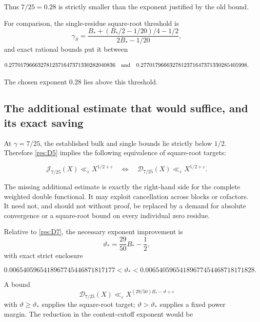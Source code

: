 \documentclass[11pt]{article}
\newcommand{\mathscr}{\mathcal}
\numberwithin{equation}{section}
\begin{document}
Thus \(7/25=0.28\) is strictly smaller than the exponent justified by
the old bound.

For comparison, the single-residue square-root threshold is \[
 \gamma_S=
 \frac{B_*+(B_*/2-1/20)/4-1/2}{2B_*-1/20},
\] and exact rational bounds put it between

\begin{equation}\label{res:D9}
0.2770179666327812371647371330282040836
 \quad\hbox{and}\quad
 0.2770179666327812371647371330285405998.
\end{equation}

The chosen exponent \(0.28\) lies above this threshold.

\subsection{The additional estimate that would suffice, and its exact
saving}\label{the-additional-estimate-that-would-suffice-and-its-exact-saving}

At \(\gamma=7/25\), the established bulk and single bounds lie strictly
below \(1/2\). Therefore \eqref{res:D5} implies the following
equivalence of square-root targets:

\begin{equation}\label{res:D10}
\mathscr J_{7/25}(X)\ll_\varepsilon X^{1/2+\varepsilon}
 \quad\Longleftrightarrow\quad
 \mathscr D_{7/25}(X)\ll_\varepsilon X^{1/2+\varepsilon}.
\end{equation}

The missing additional estimate is exactly the right-hand side for the
complete weighted double functional. It may exploit cancellation across
blocks or cofactors. It need not, and should not without proof, be
replaced by a demand for absolute convergence or a square-root bound on
every individual zero residue.

Relative to \eqref{res:D7}, the necessary exponent improvement is \[
 \vartheta_*=\frac{29}{50}B_*-\frac12,
\] with exact strict enclosure

\begin{equation}\label{res:D11}
0.0065405965418967745446871817177
 <\vartheta_*<
 0.00654059654189677454468718171828.
\end{equation}

A bound \[
 \mathscr D_{7/25}(X)
 \ll_\varepsilon X^{(29/50)B_*-\vartheta+\varepsilon}
\] with \(\vartheta\geq\vartheta_*\) supplies the square-root target;
\(\vartheta>\vartheta_*\) supplies a fixed power margin. The reduction
in the content-cutoff exponent would be
\end{document}
